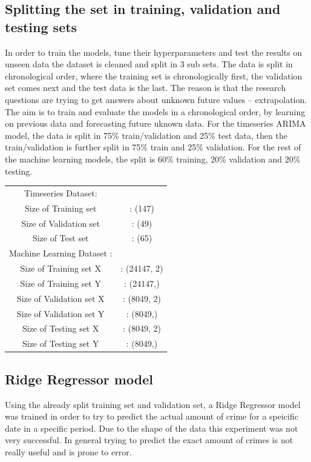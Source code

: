 \documentclass[a4paper, twocolumn]{article}
\begin{document}
\subsection{Splitting the set in training, validation and testing sets}\label{split}
In order to train the models, tune their hyperparameters and test the results on unseen data the dataset is cleaned and split in 3 sub sets.
The data is split in chronological order, where the training set is chronologically first, the validation set comes next and the test data is the last. 
The reason is that the research questions are trying to get answers about unknown future values – extrapolation. 
The aim is to train and evaluate the models in a chronological order, by learning on previous data and forecasting future uknown data. 
For the timeseries ARIMA model, the data is split in 75\% train/validation and 25\% test data, then the train/validation is further split in 75\% train and 25\% validation. 
For the rest of the machine learning models, the split is 60\% training, 20\% validation and 20\% testing.

\begin{flushleft}
    \begin{tabular}{ c c }
        Timeseries Dataset:\\
        Size of Training set &    : (147)\\
        Size of Validation set &  : (49)\\
        Size of Test set &        : (65)\\
        Machine Learning Dataset  :\\
        Size of Training set X &  : (24147, 2)\\
        Size of Training set Y&   : (24147,)\\
        Size of Validation set X &: (8049, 2)\\
        Size of Validation set Y& : (8049,)\\
        Size of Testing set X &   : (8049, 2)\\
        Size of Testing set Y&    : (8049,)\\

    \end{tabular}
\end{flushleft}

\subsection{Ridge Regressor model}
Using the already split training set and validation set, a Ridge Regressor model was trained in order to
try to predict the actual amount of crime for a speicific date in a specific period. Due to the shape of 
the data this experiment was not very successful. In general trying to predict the exact amount of crimes
is not really useful and is prone to error.
\end{document}
